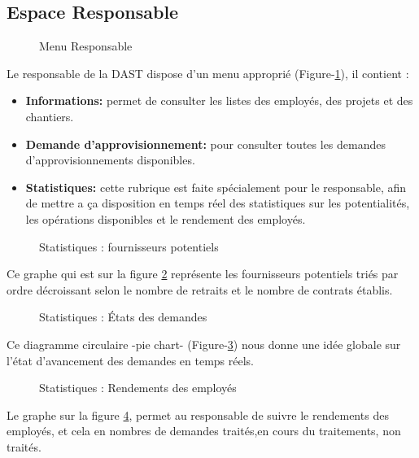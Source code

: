 \documentclass{report}
\begin{document}
\subsection{Espace Responsable}
\begin{figure}[h]
        \centering
        \caption{Menu Responsable}
        \label{13}
\end{figure}
Le responsable de la DAST dispose d'un menu approprié (Figure-\ref{13}), il contient :
\begin{itemize}
    \item \textbf{Informations:} permet de consulter les listes des employés, des projets et des chantiers.
    \item \textbf{Demande d'approvisionnement:} pour consulter toutes les demandes d'approvisionnements disponibles.
    \item \textbf{Statistiques:} cette rubrique est faite spécialement pour le responsable, afin de mettre a ça disposition en temps réel des statistiques sur les potentialités, les opérations disponibles et le rendement des employés.
\end{itemize}

\newpage
\vspace{1cm}
\begin{figure}[h]
        \centering
        \caption{Statistiques : fournisseurs potentiels}
        \label{14}
\end{figure}
Ce graphe qui est sur la figure \ref{14} représente les fournisseurs potentiels triés par ordre décroissant selon le nombre de retraits et le nombre de contrats établis.
\vspace{1.5cm}

\begin{figure}[h]
        \centering
        \caption{Statistiques : États des demandes}
        \label{15}
\end{figure}
Ce diagramme circulaire -pie chart- (Figure-\ref{15}) nous donne une idée globale sur l'état d'avancement des demandes en temps réels.
\newpage
\begin{figure}[h]
        \centering
        \caption{Statistiques : Rendements des employés}
        \label{16}
\end{figure}
Le graphe sur la figure \ref{16}, permet au responsable de suivre le rendements des employés, et cela en nombres de demandes traités,en cours du traitements, non traités.
\vspace{2cm}
\end{document}
